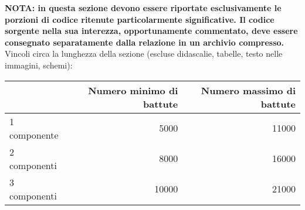 \textbf{NOTA: in questa sezione devono essere riportate esclusivamente le porzioni di codice ritenute particolarmente significative. Il codice sorgente nella sua interezza, opportunamente commentato, deve essere consegnato separatamente dalla relazione in un archivio compresso.}\\


Vincoli circa la lunghezza della sezione (escluse didascalie, tabelle, testo nelle immagini, schemi):

\vspace{1cm}
\begin{tabular}{l|rr}
                 & Numero minimo di battute & Numero massimo di battute \\
    \hline
    1 componente & 5000                     & 11000                     \\
    2 componenti & 8000                     & 16000                     \\
    3 componenti & 10000                    & 21000                     \\
    \hline
\end{tabular}


\newpage